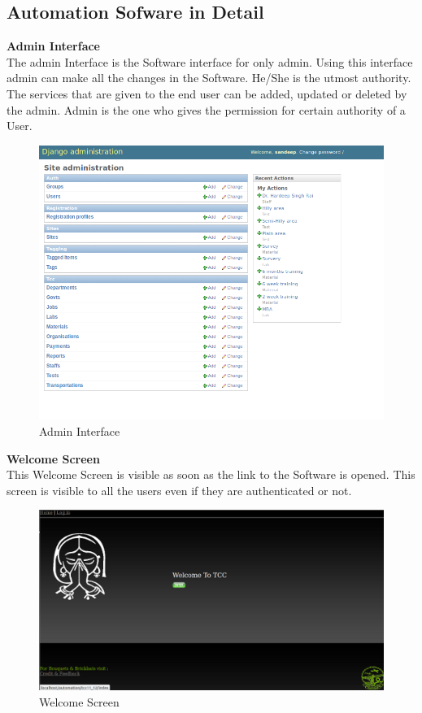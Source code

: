 \subsection{Automation Sofware in Detail}
{\bf Admin Interface}\\

The admin Interface is the Software interface for only admin. Using this interface admin can make all the changes in the Software. He/She is the utmost authority. The services that are given to the end user can be added, updated or deleted by the admin. Admin is the one who gives the permission for certain authority of a User.\\ 
\begin{figure}[h]
\centering \includegraphics[scale=0.6]{admin.png}
\caption{Admin Interface}
\end{figure}

\newpage
{\bf Welcome Screen}\\

This Welcome Screen is visible as soon as the link to the Software is opened. This screen is visible to all the users even if they are authenticated or not.
\begin{figure}[h]
\vskip 2cm
\centering \includegraphics[scale=1.0]{welcome.png}
\caption{Welcome Screen}
\end{figure}


